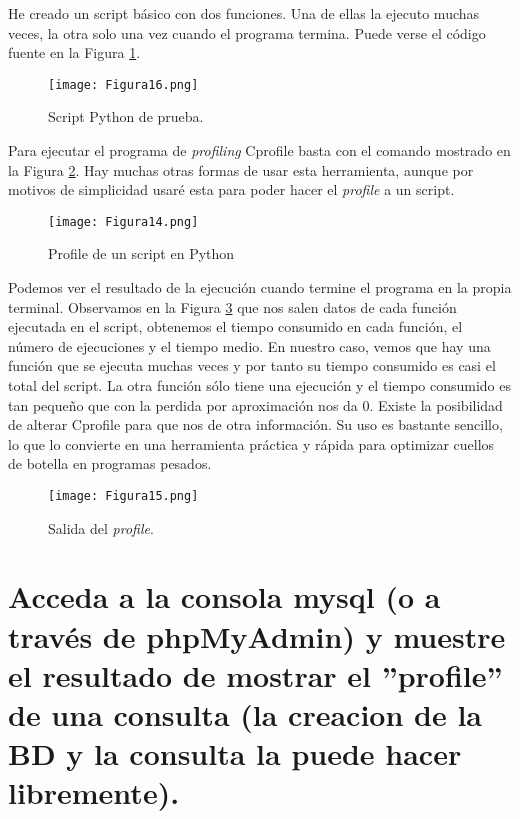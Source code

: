 He creado un script básico con dos funciones. Una de ellas la ejecuto muchas veces, la otra solo una vez cuando el programa termina. Puede verse el código fuente en 
la Figura \ref{fig:figura16}.

\begin{figure}[H] 
\centering
\texttt{[image: Figura16.png]}  
\caption{Script Python de prueba.}\label{fig:figura16}
\end{figure}

Para ejecutar el programa de \textit{profiling} Cprofile\cite{pythonprofile} basta con el comando mostrado en la Figura \ref{fig:figura14}. Hay muchas otras formas de usar esta herramienta,
aunque por motivos de simplicidad usaré esta para poder hacer el \textit{profile} a un script.

\begin{figure}[H] 
\centering
\texttt{[image: Figura14.png]}  
\caption{Profile de un script en Python}\label{fig:figura14}
\end{figure}

Podemos ver el resultado de la ejecución cuando termine el programa en la propia terminal. Observamos en la Figura \ref{fig:figura15} que nos salen datos de cada 
función ejecutada en el script, obtenemos el tiempo consumido en cada función, el número de ejecuciones y el tiempo medio. En nuestro caso, vemos que hay una 
función que se ejecuta muchas veces y por tanto su tiempo consumido es casi el total del script. La otra función sólo tiene una ejecución y el tiempo consumido es tan 
pequeño que con la perdida por aproximación nos da 0. Existe la posibilidad de alterar Cprofile para que nos de otra información. Su uso es bastante sencillo, lo que 
lo convierte en una herramienta práctica y rápida para optimizar cuellos de botella en programas pesados.

\begin{figure}[H] 
\centering
\texttt{[image: Figura15.png]}  
\caption{Salida del \textit{profile}.}\label{fig:figura15}
\end{figure}






\section{Acceda a la consola mysql (o a través de phpMyAdmin) y muestre el resultado de mostrar el ''profile'' de una consulta (la creacion de la BD y la consulta la puede hacer libremente).}

